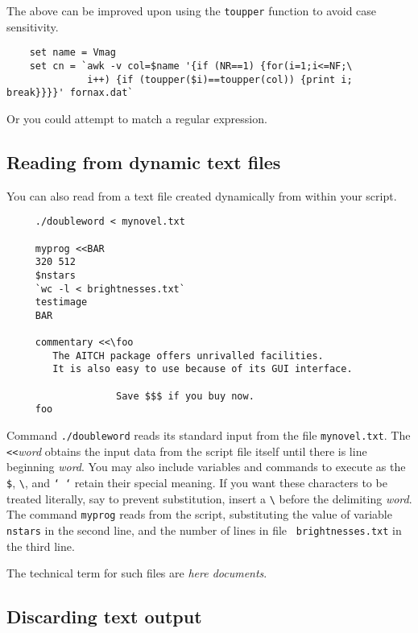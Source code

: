 \documentclass[twoside,11pt]{article}
\newcommand{\htmlref}[2]{#1}
\newcommand{\xlabel}[1]{}
\begin{document}
The above can be improved upon using the {\tt toupper} function to avoid
case sensitivity.
\small
\begin{verbatim}
    set name = Vmag
    set cn = `awk -v col=$name '{if (NR==1) {for(i=1;i<=NF;\
              i++) {if (toupper($i)==toupper(col)) {print i; break}}}}' fornax.dat`
\end{verbatim}
\normalsize
Or you could attempt to \htmlref{match}{sc4_gl_match} a
\htmlref{regular expression}{sc4_gl_reg_exp}.

\subsection{\xlabel{sc4_se_reading_files}Reading from dynamic text files
\label{sc4_se_reading_files}}

You can also read from a text file created dynamically from within
your script.

\small
\begin{verbatim}
     ./doubleword < mynovel.txt

     myprog <<BAR
     320 512
     $nstars
     `wc -l < brightnesses.txt`
     testimage
     BAR

     commentary <<\foo
        The AITCH package offers unrivalled facilities.
        It is also easy to use because of its GUI interface.
        
                   Save $$$ if you buy now.
     foo
\end{verbatim}
\normalsize
Command {\tt ./doubleword} reads its \htmlref{{\sf standard
input}}{sc4_gl_std_out} from the file {\tt mynovel.txt}.  The {\tt
<<}{\em word\/} obtains the input data from the script file itself
until there is line beginning {\em word}.  You may also include
variables and commands to execute as the {\tt \$},
\verb+\+, and {\tt `~`} retain their special meaning.  If you want these
characters to be treated literally, say to prevent substitution, insert
a \verb+\+ before the delimiting {\em word}.  The command {\tt myprog}
reads from the script, substituting the value of variable {\tt nstars}
in the second line, and the number of lines in file {\tt
brightnesses.txt} in the third line.

The technical term for such files are {\em here documents}.

\subsection{\xlabel{sc4_se_junk_output}Discarding text output
\label{sc4_se_junk_output}}
\end{document}
